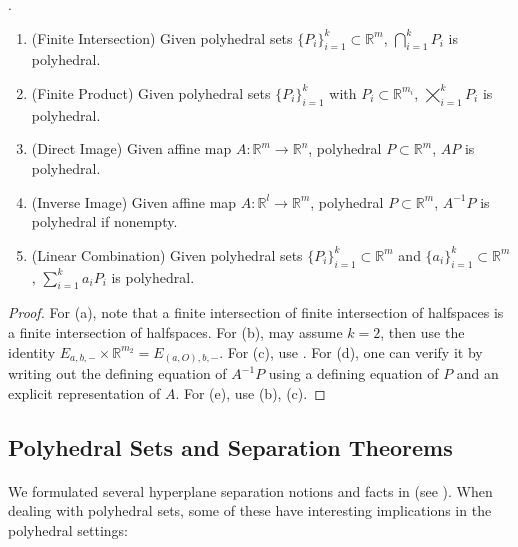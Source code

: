 \begin{prop}\label{prop:017-polyhedral-yoga}.
	\begin{enumerate}[label=(\alph*)]
		\item (Finite Intersection) Given polyhedral sets $\{P_i\}_{i=1}^{k}\subset \mathbb{R}^m$, $\bigcap_{i=1}^kP_i$ is polyhedral.
		\item (Finite Product) Given polyhedral sets $\{P_i\}_{i=1}^{k}$ with $P_i\subset \mathbb{R}^{m_i}$, $\bigtimes_{i=1}^kP_i$ is polyhedral.
		\item (Direct Image) Given affine map $A:\mathbb{R}^m\to \mathbb{R}^n$, polyhedral $P\subset \mathbb{R}^m$, $AP$ is polyhedral.
		\item (Inverse Image) Given affine map $A:\mathbb{R}^l\to \mathbb{R}^m$, polyhedral $P\subset \mathbb{R}^m$, $A^{-1}P$ is polyhedral if nonempty.
		\item (Linear Combination) Given polyhedral sets $\{P_i\}_{i=1}^{k}\subset \mathbb{R}^m$ and $\{a_i\}_{i=1}^k\subset \mathbb{R}^m$, $\sum_{i=1}^ka_iP_i$ is polyhedral.
	\end{enumerate}
\end{prop}
\begin{proof}
	For (a), note that a finite intersection of finite intersection of halfspaces is a finite intersection of halfspaces. For (b), may assume $k=2$, then use the identity $E_{a,b,-}\times \mathbb{R}^{m_2}=E_{(a,O),b,-}$. For (c), use . For (d), one can verify it by writing out the defining equation of $A^{-1}P$ using a defining equation of $P$ and an explicit representation of $A$. For (e), use (b), (c).
\end{proof}

\subsection{Polyhedral Sets and Separation Theorems}

\paragraph{}We formulated several hyperplane separation notions and facts in  (see ). When dealing with polyhedral sets, some of these have interesting implications in the polyhedral settings:

